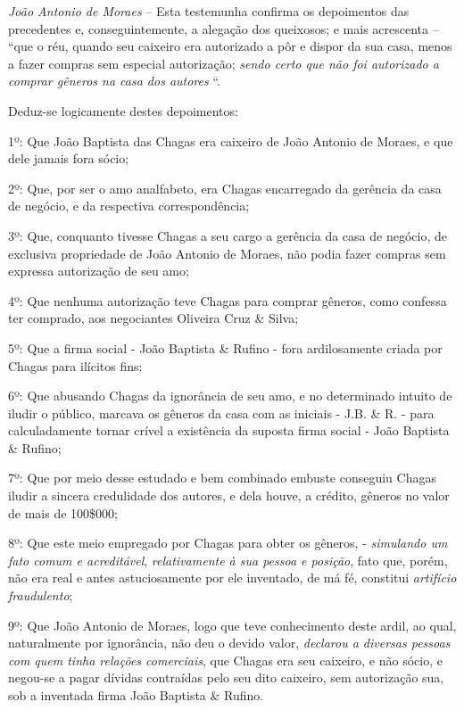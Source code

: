 \emph{João Antonio de Moraes} -- Esta testemunha confirma os
depoimentos das precedentes e, conseguintemente, a alegação dos
queixosos; e mais acrescenta -- ``que o réu, quando seu caixeiro era
autorizado a pôr e dispor da sua casa, menos a fazer compras sem
especial autorização; \emph{sendo certo que não foi autorizado a comprar
gêneros na casa dos autores} ``.

\asterisc{}

Deduz-se logicamente destes depoimentos:

1º: Que João Baptista das Chagas era caixeiro de João Antonio de Moraes,
e que dele jamais fora sócio;

2º: Que, por ser o amo analfabeto, era Chagas encarregado da gerência da
casa de negócio, e da respectiva correspondência;

3º: Que, conquanto tivesse Chagas a seu cargo a gerência da casa de
negócio, de exclusiva propriedade de João Antonio de Moraes, não podia
fazer compras sem expressa autorização de seu amo;

4º: Que nenhuma autorização teve Chagas para comprar gêneros, como
confessa ter comprado, aos negociantes Oliveira Cruz \& Silva;

5º: Que a firma social - João Baptista \& Rufino - fora ardilosamente
criada por Chagas para ilícitos fins;

6º: Que abusando Chagas da ignorância de seu amo, e no determinado
intuito de iludir o público, marcava os gêneros da casa com as iniciais
- J.B. \& R. - para calculadamente tornar crível a existência da suposta
firma social - João Baptista \& Rufino;

7º: Que por meio desse estudado e bem combinado embuste conseguiu Chagas
iludir a sincera credulidade dos autores, e dela houve, a crédito,
gêneros no valor de mais de 100\$000;

8º: Que este meio empregado por Chagas para obter os gêneros, -
\emph{simulando um fato comum e acreditável}, \emph{relativamente à sua
pessoa e posição}, fato que, porém, não era real e antes astuciosamente
por ele inventado, de má fé, constitui \emph{artifício fraudulento};

9º: Que João Antonio de Moraes, logo que teve conhecimento deste ardil,
ao qual, naturalmente por ignorância, não deu o devido valor,
\emph{declarou a diversas pessoas com quem tinha relações comerciais},
que Chagas era seu caixeiro, e não sócio, e negou-se a pagar dívidas
contraídas pelo seu dito caixeiro, sem autorização sua, sob a inventada
firma João Baptista \& Rufino.

